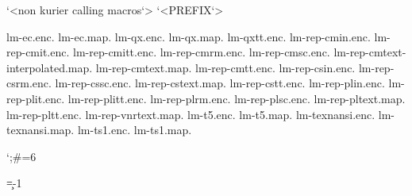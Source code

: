 \documentclass{article}
\begin{document}
   \def\FAM{lm}
   \def\YR{2005}
   \def\NEW{-LM-05}
   `<non kurier calling macros`>
   `<PREFIX`>

lm-ec.enc.         
lm-ec.map.                       
lm-qx.enc.         
lm-qx.map.                       
lm-qxtt.enc.       
lm-rep-cmin.enc.   
lm-rep-cmit.enc.   
lm-rep-cmitt.enc.  
lm-rep-cmrm.enc.   
lm-rep-cmsc.enc.   
lm-rep-cmtext-interpolated.map.  
lm-rep-cmtext.map.               
lm-rep-cmtt.enc.   
lm-rep-csin.enc.   
lm-rep-csrm.enc.   
lm-rep-cssc.enc.   
lm-rep-cstext.map.               
lm-rep-cstt.enc.   
lm-rep-plin.enc.   
lm-rep-plit.enc.   
lm-rep-plitt.enc.  
lm-rep-plrm.enc.   
lm-rep-plsc.enc.
lm-rep-pltext.map.
lm-rep-pltt.enc.
lm-rep-vnrtext.map.
lm-t5.enc.
lm-t5.map.
lm-texnansi.enc.
lm-texnansi.map.
lm-ts1.enc.
lm-ts1.map.

\bgroup
\catcode`;\#=6

\c=-1
\def\z#1{%
  \advance\c by 1
  \immediate\write16{'\csname /#1 \endcsname' '' `;\COM#1 `;\COM  \space \the\c }}
\end{document}
